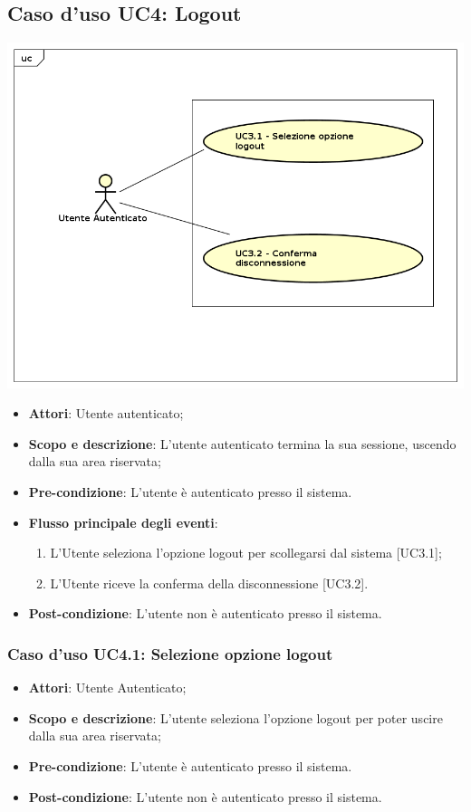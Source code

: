 \subsection{Caso d'uso UC4: Logout}
	\begin{center}
		\includegraphics[scale=0.5]{UML/UC3.png}
	\end{center}
	\begin{itemize}
		\item
			\textbf{Attori}: Utente autenticato;
		\item		
			\textbf{Scopo e descrizione}: L'utente autenticato termina la sua sessione, uscendo dalla sua area riservata;
		\item
			\textbf{Pre-condizione}: L'utente è autenticato presso il sistema. 
		\item
			\textbf{Flusso principale degli eventi}:
	       		\begin{enumerate}
					\item 	
					L'Utente seleziona l'opzione logout per scollegarsi dal sistema [UC3.1];
					\item
					L'Utente riceve la conferma della disconnessione [UC3.2].
	 			\end{enumerate}
		\item
			\textbf{	Post-condizione}: L'utente non è autenticato presso il sistema.
	\end{itemize}

\subsubsection{Caso d'uso UC4.1: Selezione opzione logout}
	\begin{itemize}
		\item		
			\textbf{Attori}: Utente Autenticato;
		\item
  			\textbf{Scopo e descrizione}: L'utente seleziona l'opzione logout per poter uscire dalla sua area riservata;
		\item
			\textbf{Pre-condizione}: L'utente è autenticato presso il sistema. 
		\item
			\textbf{Post-condizione}: L'utente non è autenticato presso il sistema.
	\end{itemize}

